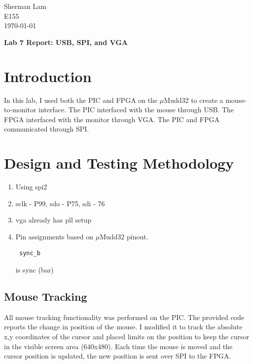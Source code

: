 \documentclass[11pt]{article}
\begin{document}
\begin{flushleft}
Sherman Lam
\\E155
\\ \today
\end{flushleft}


\begin{center}
\begin{Large}
\textbf{Lab 7 Report: USB, SPI, and VGA}
\end{Large}
\end{center}




\section{Introduction}
In this lab, I used both the PIC and FPGA on the $\mu$Mudd32 to create a mouse-to-monitor interface. The PIC interfaced with the mouse through USB. The FPGA interfaced with the monitor through VGA. The PIC and FPGA communicated through SPI. \\


\section{Design and Testing Methodology}

\begin{enumerate}
\item Using spi2
\item sclk - P99, sdo - P75, sdi - 76
\item vga already has pll setup
\item Pin assignments based on $\mu$Mudd32 pinout. \begin{verbatim} sync_b \end{verbatim} is sync (bar)
\end{enumerate}

\subsection{Mouse Tracking}
All mouse tracking functionality was performed on the PIC. The provided code reports the change in position of the mouse. I modified it to track the absolute x,y coordinates of the cursor and placed limits on the position to keep the cursor in the visible screen area (640x480). Each time the mouse is moved and the cursor position is updated, the new position is sent over SPI to the FPGA. \\
\end{document}
